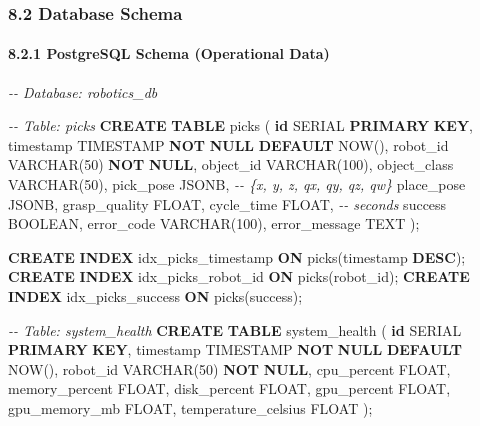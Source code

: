 \documentclass[
]{article}
\newenvironment{Shaded}{\begin{snugshade}}{\end{snugshade}}
\newcommand{\CommentTok}[1]{\textcolor[rgb]{0.56,0.35,0.01}{\textit{#1}}}
\newcommand{\DataTypeTok}[1]{\textcolor[rgb]{0.13,0.29,0.53}{#1}}
\newcommand{\DecValTok}[1]{\textcolor[rgb]{0.00,0.00,0.81}{#1}}
\newcommand{\KeywordTok}[1]{\textcolor[rgb]{0.13,0.29,0.53}{\textbf{#1}}}
\newcommand{\NormalTok}[1]{#1}
\begin{document}
\hypertarget{database-schema}{%
\subsubsection{8.2 Database Schema}\label{database-schema}}

\hypertarget{postgresql-schema-operational-data}{%
\paragraph{8.2.1 PostgreSQL Schema (Operational
Data)}\label{postgresql-schema-operational-data}}

\begin{Shaded}
\begin{Highlighting}[]
\CommentTok{{-}{-} Database: robotics\_db}

\CommentTok{{-}{-} Table: picks}
\KeywordTok{CREATE} \KeywordTok{TABLE}\NormalTok{ picks (}
    \KeywordTok{id}\NormalTok{ SERIAL }\KeywordTok{PRIMARY} \KeywordTok{KEY}\NormalTok{,}
    \DataTypeTok{timestamp} \DataTypeTok{TIMESTAMP} \KeywordTok{NOT} \KeywordTok{NULL} \KeywordTok{DEFAULT}\NormalTok{ NOW(),}
\NormalTok{    robot\_id }\DataTypeTok{VARCHAR}\NormalTok{(}\DecValTok{50}\NormalTok{) }\KeywordTok{NOT} \KeywordTok{NULL}\NormalTok{,}
\NormalTok{    object\_id }\DataTypeTok{VARCHAR}\NormalTok{(}\DecValTok{100}\NormalTok{),}
\NormalTok{    object\_class }\DataTypeTok{VARCHAR}\NormalTok{(}\DecValTok{50}\NormalTok{),}
\NormalTok{    pick\_pose JSONB,  }\CommentTok{{-}{-} \{x, y, z, qx, qy, qz, qw\}}
\NormalTok{    place\_pose JSONB,}
\NormalTok{    grasp\_quality }\DataTypeTok{FLOAT}\NormalTok{,}
\NormalTok{    cycle\_time }\DataTypeTok{FLOAT}\NormalTok{,  }\CommentTok{{-}{-} seconds}
\NormalTok{    success }\DataTypeTok{BOOLEAN}\NormalTok{,}
\NormalTok{    error\_code }\DataTypeTok{VARCHAR}\NormalTok{(}\DecValTok{100}\NormalTok{),}
\NormalTok{    error\_message TEXT}
\NormalTok{);}

\KeywordTok{CREATE} \KeywordTok{INDEX}\NormalTok{ idx\_picks\_timestamp }\KeywordTok{ON}\NormalTok{ picks(}\DataTypeTok{timestamp} \KeywordTok{DESC}\NormalTok{);}
\KeywordTok{CREATE} \KeywordTok{INDEX}\NormalTok{ idx\_picks\_robot\_id }\KeywordTok{ON}\NormalTok{ picks(robot\_id);}
\KeywordTok{CREATE} \KeywordTok{INDEX}\NormalTok{ idx\_picks\_success }\KeywordTok{ON}\NormalTok{ picks(success);}

\CommentTok{{-}{-} Table: system\_health}
\KeywordTok{CREATE} \KeywordTok{TABLE}\NormalTok{ system\_health (}
    \KeywordTok{id}\NormalTok{ SERIAL }\KeywordTok{PRIMARY} \KeywordTok{KEY}\NormalTok{,}
    \DataTypeTok{timestamp} \DataTypeTok{TIMESTAMP} \KeywordTok{NOT} \KeywordTok{NULL} \KeywordTok{DEFAULT}\NormalTok{ NOW(),}
\NormalTok{    robot\_id }\DataTypeTok{VARCHAR}\NormalTok{(}\DecValTok{50}\NormalTok{) }\KeywordTok{NOT} \KeywordTok{NULL}\NormalTok{,}
\NormalTok{    cpu\_percent }\DataTypeTok{FLOAT}\NormalTok{,}
\NormalTok{    memory\_percent }\DataTypeTok{FLOAT}\NormalTok{,}
\NormalTok{    disk\_percent }\DataTypeTok{FLOAT}\NormalTok{,}
\NormalTok{    gpu\_percent }\DataTypeTok{FLOAT}\NormalTok{,}
\NormalTok{    gpu\_memory\_mb }\DataTypeTok{FLOAT}\NormalTok{,}
\NormalTok{    temperature\_celsius }\DataTypeTok{FLOAT}
\NormalTok{);}


\end{Highlighting}
\end{Shaded}
\end{document}
